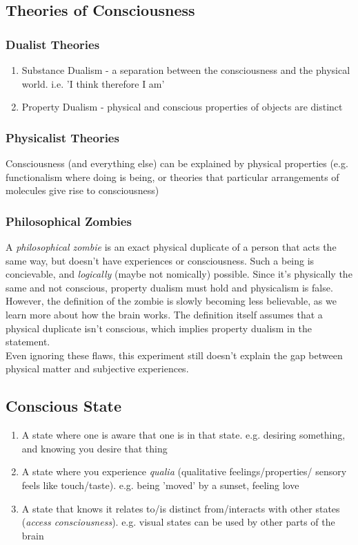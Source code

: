 \subsection{Theories of Consciousness}
\subsubsection{Dualist Theories}
\begin{enumerate}
    \item Substance Dualism - a separation between the consciousness and the physical world. i.e. 'I think therefore I am'
    \item Property Dualism - physical and conscious properties of objects are distinct 
\end{enumerate}

\subsubsection{Physicalist Theories}
Consciousness (and everything else) can be explained by physical properties (e.g. functionalism where doing is being, or theories that particular arrangements of molecules give rise to consciousness) 

\subsubsection{Philosophical Zombies}
A \emph{philosophical zombie} is an exact physical duplicate of a person that acts the same way, but doesn't have experiences or consciousness. Such a being is concievable, and \emph{logically} (maybe not nomically) possible. Since it's physically the same and not conscious, property dualism must hold and physicalism is false. \\

However, the definition of the zombie is slowly becoming less believable, as we learn more about how the brain works. The definition itself assumes that a physical duplicate isn't conscious, which implies property dualism in the statement.\\

Even ignoring these flaws, this experiment still doesn't explain the gap between physical matter and subjective experiences.

\subsection{Conscious State}
\begin{enumerate}
    \item A state where one is aware that one is in that state. e.g. desiring something, and knowing you desire that thing
    \item A state where you experience \emph{qualia} (qualitative feelings/properties/ sensory feels like touch/taste). e.g. being 'moved' by a sunset, feeling love
    \item A state that knows it relates to/is distinct from/interacts with other states (\emph{access consciousness}). e.g. visual states can be used by other parts of the brain
\end{enumerate}


